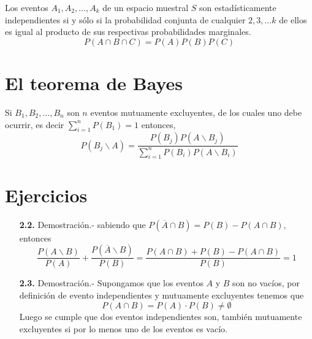 \begin{tcolorbox}[colframe = white]
    \begin{def.} Los eventos $A_1,A_2,\ldots, A_k$ de un espacio muestral $S$ son estadísticamente independientes si y sólo si la probabilidad conjunta de cualquier $2,3,\ldots k$ de ellos es igual al producto de sus respectivas probabilidades marginales.
	$$P(A\cap B \cap C) = P(A)P(B)P(C)$$
    \end{def.}
\end{tcolorbox}

\section{El teorema de Bayes}

\begin{teo} Si $B_1,B_2,\ldots, B_n$ son $n$ eventos mutuamente excluyentes, de los cuales uno debe ocurrir, es decir $\sum_{i=1}^n P(B_1) = 1$ entonces,
    \begin{equation}
	P(B_j \backslash A) = \dfrac{P(B_j)P(A\backslash B_j)}{\sum\limits_{i=1}^n P(B_i)P(A\backslash B_i)}
    \end{equation}
\end{teo}
\vspace{1cm}

\section{Ejercicios}
\begin{enumerate}

    \item[\bfseries 2.2.] Demostración.-\; sabiendo que $P(\overline{A}\cap B) = P(B) - P(A\cap B)$, entonces 
	$$\dfrac{P(A\backslash B)}{P(A)}+\dfrac{P(\overline{A}\backslash B)}{P(B)} = \dfrac{P(A\cap B)+P(B)-P(A\cap B)}{P(B)} = 1$$

    \item[\bfseries 2.3.] Demostración.-\; Supongamos que los eventos $A$ y $B$ son no vacíos, por definición de evento independientes y mutuamente excluyentes tenemos que $$P(A\cap B) = P(A)\cdot P(B) \neq \emptyset$$  
	Luego se cumple que dos eventos independientes son, también mutuamente excluyentes si por lo menos uno de los eventos es vacío.\\\\

\end{enumerate}
